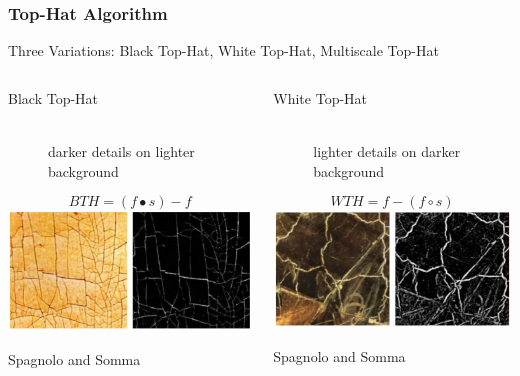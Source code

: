 \documentclass{beamer}
\begin{document}
\begin{frame}
\frametitle{Top-Hat Algorithm}
Three Variations: Black Top-Hat, White Top-Hat, Multiscale Top-Hat
\linebreak
\begin{columns}
\begin{column}{0.5\textwidth}
\begin{description}
\item[Black Top-Hat] \hfill \\ darker details on lighter background
\end{description}
\begin{equation*}
BTH = (f \bullet s) - f
\end{equation*}
\includegraphics[width=1\textwidth]{black_top_hat}
\begin{center}
\tiny Spagnolo and Somma
\end{center}
\end{column}
\begin{column}{0.5\textwidth}
\begin{description}
\item[White Top-Hat] \hfill \\ lighter details on darker background
\end{description}
\begin{equation*}
WTH = f - (f \circ s)
\end{equation*}
\includegraphics[width=1\textwidth]{white_top_hat}
\begin{center}
\tiny Spagnolo and Somma
\end{center}
\end{column}
\end{columns}
\end{frame}
\end{document}
